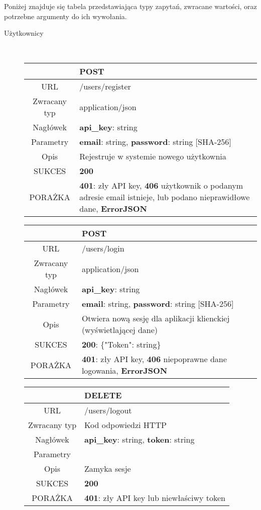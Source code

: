 Poniżej znajduje się tabela przedstawiająca typy zapytań, zwracane wartości, oraz potrzebne argumenty do ich wywołania. 

\begin{description}
	\item[Użytkownicy] \hfill \\
	
		\begin{tabularx}{\linewidth} {|c|X|}
		\hline
						& {\bf POST}\\ \hline
		  URL 			& /users/register\\
		  Zwracany typ 	& application/json\\
		  Nagłówek 		& {\bf api\_key}: string\\
		  Parametry 	& {\bf email}: string, {\bf password}: string [SHA-256]\\
		  Opis 			& Rejestruje w systemie nowego użytkownia \\
		  SUKCES 		& {\bf 200}\\
		  PORAŻKA 		& {\bf 401}: zły API key, {\bf 406} użytkownik o podanym adresie email istnieje, lub podano nieprawidłowe dane, {\bf ErrorJSON}\\
		  \hline
		\end{tabularx}
		
		\begin{tabularx}{\linewidth} {|c|X|}
		\hline
						& {\bf POST}\\ \hline
		  URL 			& /users/login\\
		  Zwracany typ 	& application/json\\
		  Nagłówek 		& {\bf api\_key}: string\\
		  Parametry 	& {\bf email}: string, {\bf password}: string [SHA-256]\\
		  Opis 			& Otwiera nową sesję dla aplikacji klienckiej (wyświetlającej dane) \\
		  SUKCES 		& {\bf 200}: \{"Token": string\} \\
		  PORAŻKA 		& {\bf 401}: zły API key, {\bf 406} niepoprawne dane logowania, {\bf ErrorJSON}\\
		  \hline
		\end{tabularx}
		
		\begin{tabularx}{\linewidth} {|c|X|}
			\hline
						& {\bf DELETE}\\ \hline
		  URL 			& /users/logout\\
		  Zwracany typ 	& Kod odpowiedzi HTTP\\
		  Nagłówek 		& {\bf api\_key}: string, {\bf token}: string\\
		  Parametry 	& \\
		  Opis 			& Zamyka sesje \\
		  SUKCES 		& {\bf 200} \\
		  PORAŻKA 		& {\bf 401}: zły API key lub niewłaściwy token\\
		  \hline
		\end{tabularx}
		

\end{description}
